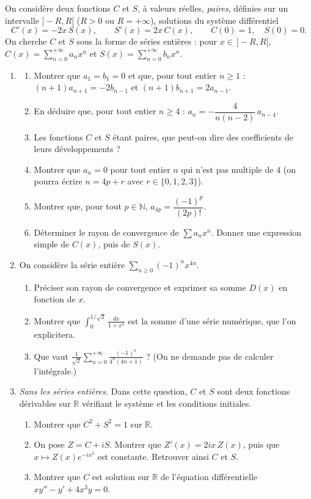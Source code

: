 \documentclass[a4paper,11pt]{article}
\numberwithin{equation}{section}
\numberwithin{figure}{section}
\numberwithin{table}{section}
\theoremstyle{enonce}
\theoremstyle{exemple}
\theoremstyle{remarque}
\newcommand{\R}{\mathbb{R}}
\newcommand{\N}{\mathbb{N}}
\begin{document}
On considère deux fonctions $C$ et $S$, à valeurs réelles, \emph{paires}, définies sur un intervalle $]-R,R[$ ($R>0$ ou $R=+\infty$), solutions du
système différentiel
\[C'(x)=-2x\,S(x),\qquad S'(x)=2x\,C(x),\qquad C(0)=1,\quad S(0)=0.\]
On cherche $C$ et $S$ sous la forme de séries entières : pour $x\in\,]-R,R[$, $C(x)=\sum_{n=0}^{+\infty}a_nx^n$ et $S(x)=\sum_{n=0}^{+\infty}b_nx^n$.
\begin{enumerate}
\item
\begin{enumerate}[label=(\alph*)]
\item Montrer que $a_1=b_1=0$ et que, pour tout entier $n\geq1$ : $(n+1)a_{n+1}=-2b_{n-1}$ et $(n+1)b_{n+1}=2a_{n-1}$.
\item En déduire que, pour tout entier $n\geq4$ : $a_n=-\dfrac4{n(n-2)}\,a_{n-4}$.
\item Les fonctions $C$ et $S$ étant paires, que peut-on dire des coefficients de leurs développements ?
\item Montrer que $a_n=0$ pour tout entier $n$ qui n'est pas multiple de $4$ (on pourra écrire $n=4p+r$ avec $r\in\{0,1,2,3\}$).
\item Montrer que, pour tout $p\in\N$, $a_{4p}=\dfrac{(-1)^p}{(2p)!}$.
\item Déterminer le rayon de convergence de $\sum a_nx^n$. Donner une expression simple de $C(x)$, puis de $S(x)$.
\end{enumerate}
\item On considère la série entière $\sum_{n\geq0}(-1)^nx^{4n}$.
\begin{enumerate}[label=(\alph*)]
\item Préciser son rayon de convergence et exprimer sa somme $D(x)$ en fonction de $x$.
\item Montrer que $\displaystyle\int_0^{1/\sqrt2}\frac{dx}{1+x^4}$ est la somme d'une série numérique, que l'on explicitera.
\item Que vaut $\displaystyle\frac1{\sqrt2}\sum_{n=0}^{+\infty}\frac{(-1)^n}{4^n(4n+1)}$ ? (On ne demande pas de calculer l'intégrale.)
\end{enumerate}
\item \emph{Sans les séries entières.} Dans cette question, $C$ et $S$ sont deux fonctions dérivables sur $\R$ vérifiant le système et les conditions initiales.
\begin{enumerate}[label=(\alph*)]
\item Montrer que $C^2+S^2=1$ sur $\R$.
\item On pose $Z=C+iS$. Montrer que $Z'(x)=2ix\,Z(x)$, puis que $x\mapsto Z(x)e^{-ix^2}$ est constante. Retrouver ainsi $C$ et $S$.
\item Montrer que $C$ est solution sur $\R$ de l'équation différentielle $xy''-y'+4x^3y=0$.
\end{enumerate}
\end{enumerate}
\end{document}
